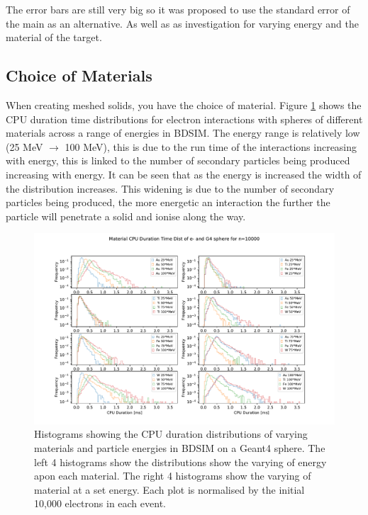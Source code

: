 \documentclass[12pt,a4paper]{article}
\begin{document}
The error bars are still very big so it was proposed to use the standard error of the main as an alternative. As well as as investigation for varying energy and the material of the target.

\subsection{Choice of Materials}
When creating meshed solids, you have the choice of material. Figure \ref{novar} shows the CPU duration time distributions for electron interactions with spheres of different materials across a range of energies in BDSIM. The energy range is relatively low (25 MeV $\rightarrow$ 100 MeV), this is due to the run time of the interactions increasing with energy, this is linked to the number of secondary particles being produced increasing with energy. It can be seen that as the energy is increased the width of the distribution increases. This widening is due to the number of secondary particles being produced, the more energetic an interaction the further the particle will penetrate a solid and ionise along the way.

\begin{figure}[h!]
\centering
\includegraphics[scale=0.6]{Images//Materials//not_Varied_by_radius_and_secondaries.pdf}
\caption[width=\columnwidth]{Histograms showing the CPU duration distributions of varying materials and particle energies in BDSIM on a Geant4 sphere. The left 4 histograms show the distributions show the varying of energy apon each material. The right 4 histograms show the varying of material at a set energy. Each plot is normalised by the initial 10,000 electrons in each event.}
\label{novar}
\end{figure}
\end{document}
